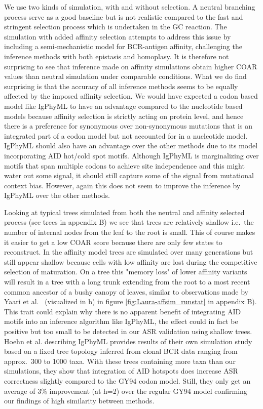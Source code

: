 We use two kinds of simulation, with and without selection.
A neutral branching process serve as a good baseline but is not realistic compared to the fast and stringent selection process which is undertaken in the GC reaction.
The simulation with added affinity selection attempts to address this issue by including a semi-mechanistic model for BCR-antigen affinity, challenging the inference methods with both epistasis and homoplasy.
It is therefore not surprising to see that inference made on affinity simulations obtain higher COAR values than neutral simulation under comparable conditions.
What we do find surprising is that the accuracy of all inference methods seems to be equally affected by the imposed affinity selection.
We would have expected a codon based model like IgPhyML to have an advantage compared to the nucleotide based models because affinity selection is strictly acting on protein level, and hence there is a preference for synonymous over non-synonymous mutations that is an integrated part of a codon model but not accounted for in a nucleotide model.
IgPhyML should also have an advantage over the other methods due to its model incorporating AID hot/cold spot motifs.
Although IgPhyML is marginalizing over motifs that span multiple codons to achieve site independence and this might water out some signal, it should still capture some of the signal from mutational context bias.
However, again this does not seem to improve the inference by IgPhyML over the other methods.

Looking at typical trees simulated from both the neutral and affinity selected process (see trees in appendix B) we see that trees are relatively shallow i.e.\ the number of internal nodes from the leaf to the root is small.
This of course makes it easier to get a low COAR score because there are only few states to reconstruct.
In the affinity model trees are simulated over many generations but still appear shallow because cells with low affinity are lost during the competitive selection of maturation.
On a tree this "memory loss" of lower affinity variants will result in a tree with a long trunk extending from the root to a most recent common ancestor of a bushy canopy of leaves, similar to observations made by Yaari et al.\ \cite{yaari2015mutation} (visualized in b) in figure \ref{fig:Laura-affsim_runstat} in appendix B).
This trait could explain why there is no apparent benefit of integrating AID motifs into an inference algorithm like IgPhyML, the effect could in fact be positive but too small to be detected in our ASR validation using shallow trees.
Hoehn et al. describing IgPhyML provides results of their own simulation study based on a fixed tree topology inferred from clonal BCR data ranging from approx.\ 300 to 1000 taxa.
With these trees containing more taxa than our simulations, they show that integration of AID hotspots does increase ASR correctness slightly compared to the GY94 codon model.
Still, they only get an average of 3\% improvement (at h=2) over the regular GY94 model confirming our findings of high similarity between methods.


